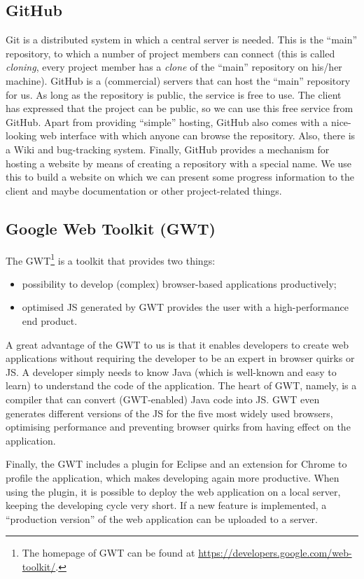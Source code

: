 \subsection{GitHub}
\label{subsec:tools-github}
Git is a distributed system in which a central server is needed. This is the ``main'' repository, to which a number of project members can connect (this is called \emph{cloning}, every project member has a \emph{clone} of the ``main'' repository on his/her machine). GitHub is a (commercial) servers that can host the ``main'' repository for us. As long as the repository is public, the service is free to use. The client has expressed that the project can be public, so we can use this free service from GitHub. Apart from providing ``simple'' hosting, GitHub also comes with a nice-looking web interface with which anyone can browse the repository. Also, there is a Wiki and bug-tracking system. Finally, GitHub provides a mechanism for hosting a website by means of creating a repository with a special name. We use this to build a website on which we can present some progress information to the client and maybe documentation or other project-related things.

\subsection{Google Web Toolkit (GWT)}
\label{subsec:tools-gwt}
The GWT\footnote{The homepage of GWT can be found at \url{https://developers.google.com/web-toolkit/}.} is a toolkit that provides two things:
\begin{itemize}
	\item possibility to develop (complex) browser-based applications productively;
	\item optimised JS generated by GWT provides the user with a high-performance end product.
\end{itemize}
A great advantage of the GWT to us is that it enables developers to create web applications without requiring the developer to be an expert in browser quirks or JS. A developer simply needs to know Java (which is well-known and easy to learn) to understand the code of the application. The heart of GWT, namely, is a compiler that can convert (GWT-enabled) Java code into JS. GWT even generates different versions of the JS for the five most widely used browsers, optimising performance and preventing browser quirks from having effect on the application.

Finally, the GWT includes a plugin for Eclipse and an extension for Chrome to profile the application, which makes developing again more productive. When using the plugin, it is possible to deploy the web application on a local server, keeping the developing cycle very short. If a new feature is implemented, a ``production version'' of the web application can be uploaded to a server.

